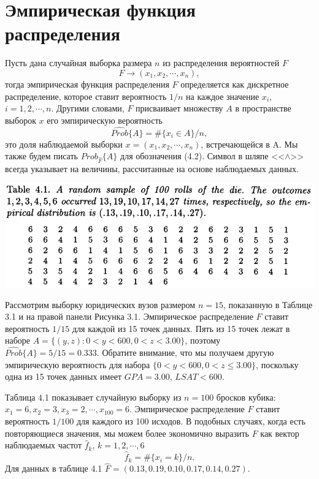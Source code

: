 \section{Эмпирическая функция распределения}

Пусть дана случайная выборка размера $n$ из распределения вероятностей $F$
\begin{equation}
    F\rightarrow(x_1,x_2,\cdots,x_n),
\end{equation}
тогда эмпирическая функция распределения  $F$ определяется как дискретное распределение, которое ставит вероятность $1 / n$ на каждое значение $x_i$, $i = 1, 2, \cdots, n$. Другими словами, $F$ присваивает множеству $A$ в пространстве выборок $x$ его эмпирическую вероятность 
\begin{equation}
    \widehat{Prob}\{A\}=\#\{x_i\in A\}/n,
\end{equation}
это доля наблюдаемой выборки $x = (x_1, x_2,\cdots, x_n)$, встречающейся в A. Мы также будем писать $Prob_{\hat F}\{A\}$ для обозначения (4.2). Символ в шляпе <<$\wedge$>> всегда указывает на величины, рассчитанные на основе наблюдаемых данных. 
\newline

\noindent
\includegraphics[width=\linewidth]{3/t41.png}
\newline

Рассмотрим выборку юридических вузов размером $n = 15$, показанную в Таблице 3.1 и на правой панели Рисунка 3.1. Эмпирическое распределение $F$ ставит вероятность $1/15$ для каждой из 15 точек данных. Пять из 15 точек лежат в наборе $A = \{(y, z): 0 <y <600,0 <z <3.00\}$, поэтому $\widehat{Prob}\{A\} = 5/15 = 0.333$. Обратите внимание, что мы получаем другую эмпирическую вероятность для набора $\{0 <y <600,0 <z \le 3.00\}$, поскольку одна из 15 точек данных имеет $GPA = 3.00$, $LSAT < 600$. 

Таблица 4.1 показывает случайную выборку из $n = 100$ бросков кубика: $x_1 = 6, x_2 = 3, x_3 = 2,\cdots, x_{100} = 6$. Эмпирическое распределение $F$ ставит вероятность $1/100$ для каждого из 100 исходов. В подобных случаях, когда есть повторяющиеся значения, мы можем более экономично выразить $F$ как вектор наблюдаемых частот $\hat f_k$, $k=1,2,\cdots,6$
\begin{equation}
    \hat f_k = \#\{x_i=k\}/n.
\end{equation}
Для данных в таблице 4.1 $\hat F= (0.13, 0.19, 0.10, 0.17, 0.14, 0.27)$.

